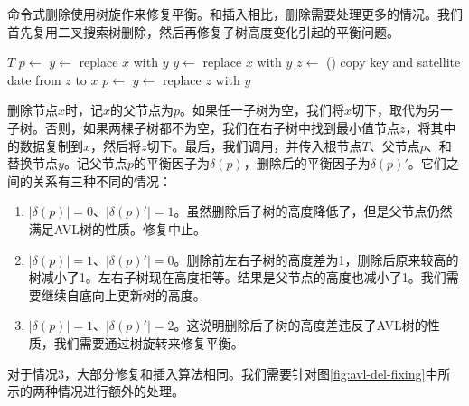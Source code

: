 \documentclass[b5paper]{ctexart}
\begin{document}
命令式删除使用树旋作来修复平衡。和插入相比，删除需要处理更多的情况。我们首先复用二叉搜索树删除，然后再修复子树高度变化引起的平衡问题。

\begin{algorithmic}[1]
    \State \Return $T$
  \EndIf
  \State $p \gets$ 
    \State $y \gets $ 
    \State replace $x$ with $y$
    \State $y \gets $ 
    \State replace $x$ with $y$
  \Else
    \State $z \gets$ ()
    \State copy key and satellite date from $z$ to $x$
    \State $p \gets$ 
    \State $y \gets$ 
    \State replace $z$ with $y$
  \EndIf
  \State \Return {}
\EndFunction
\end{algorithmic}

删除节点$x$时，记$x$的父节点为$p$。如果任一子树为空，我们将$x$切下，取代为另一子树。否则，如果两棵子树都不为空，我们在右子树中找到最小值节点$z$，将其中的数据复制到$x$，然后将$z$切下。最后，我们调用，并传入根节点$T$、父节点$p$、和替换节点$y$。记父节点$p$的平衡因子为$\delta(p)$，删除后的平衡因子为$\delta(p)'$。它们之间的关系有三种不同的情况：

\begin{enumerate}
\item $|\delta(p)| = 0$、$|\delta(p)'| = 1$。虽然删除后子树的高度降低了，但是父节点仍然满足AVL树的性质。修复中止。

\item $|\delta(p)| = 1$、$|\delta(p)'| = 0$。删除前左右子树的高度差为1，删除后原来较高的树减小了1。左右子树现在高度相等。结果是父节点的高度也减小了1。我们需要继续自底向上更新树的高度。

\item $|\delta(p)| = 1$、$|\delta(p)'| = 2$。这说明删除后子树的高度差违反了AVL树的性质，我们需要通过树旋转来修复平衡。
\end{enumerate}

对于情况3，大部分修复和插入算法相同。我们需要针对图\cref{fig:avl-del-fixing}中所示的两种情况进行额外的处理。
\end{document}
